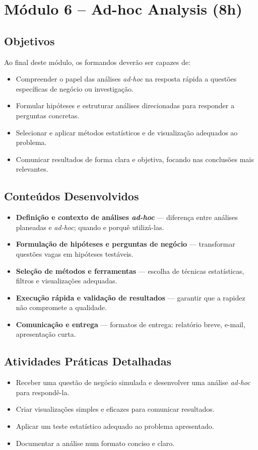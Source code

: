 \section{\textcolor{sectionred}{Módulo 6 – Ad-hoc Analysis (8h)}}

\subsection{\textcolor{subsectionblue}{Objetivos}}
Ao final deste módulo, os formandos deverão ser capazes de:
\begin{itemize}
  \item Compreender o papel das análises \textit{ad-hoc} na resposta rápida a questões específicas de negócio ou investigação.  
  \item Formular hipóteses e estruturar análises direcionadas para responder a perguntas concretas.  
  \item Selecionar e aplicar métodos estatísticos e de visualização adequados ao problema.  
  \item Comunicar resultados de forma clara e objetiva, focando nas conclusões mais relevantes.
\end{itemize}

\subsection{\textcolor{subsectionblue}{Conteúdos Desenvolvidos}}
\begin{itemize}
  \item \textbf{Definição e contexto de análises \textit{ad-hoc}} — diferença entre análises planeadas e \textit{ad-hoc}; quando e porquê utilizá-las.
  \item \textbf{Formulação de hipóteses e perguntas de negócio} — transformar questões vagas em hipóteses testáveis.
  \item \textbf{Seleção de métodos e ferramentas} — escolha de técnicas estatísticas, filtros e visualizações adequadas.
  \item \textbf{Execução rápida e validação de resultados} — garantir que a rapidez não compromete a qualidade.
  \item \textbf{Comunicação e entrega} — formatos de entrega: relatório breve, e-mail, apresentação curta.
\end{itemize}

\subsection{\textcolor{subsectionblue}{Atividades Práticas Detalhadas}}
\begin{itemize}
  \item Receber uma questão de negócio simulada e desenvolver uma análise \textit{ad-hoc} para respondê-la.
  \item Criar visualizações simples e eficazes para comunicar resultados.
  \item Aplicar um teste estatístico adequado ao problema apresentado.
  \item Documentar a análise num formato conciso e claro.
\end{itemize}

